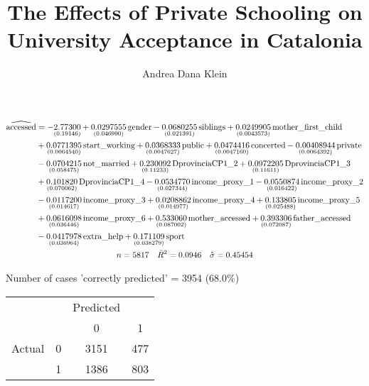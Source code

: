 \documentclass[11pt]{beamer}
\title{The Effects of Private Schooling on University Acceptance in Catalonia}
\author{Andrea Dana Klein}
\begin{document}
\begin{frame}
\titlepage 
\end{frame}

\begin{frame}
\scriptsize

\begin{gather}
\begin{split}
\widehat{\rm accessed} &= 
-\underset{(0.19146)}{2.77300}
+\underset{(0.046990)}{0.0297555}\,\mbox{gender}
-\underset{(0.021391)}{0.0680255}\,\mbox{siblings}
+\underset{(0.0043573)}{0.0249905}\,\mbox{mother\_first\_child}\\
& +\underset{(0.0064540)}{0.0771395}\,\mbox{start\_working}
+\underset{(0.0047627)}{0.0368333}\,\mbox{public}
+\underset{(0.0047160)}{0.0474416}\,\mbox{concerted}
-\underset{(0.0064392)}{0.00408944}\,\mbox{private}\\
& -\underset{(0.058475)}{0.0704215}\,\mbox{not\_married}
+\underset{(0.11233)}{0.230092}\,\mbox{DprovinciaCP1\_2}
+\underset{(0.11611)}{0.0972205}\,\mbox{DprovinciaCP1\_3}\\
& +\underset{(0.070062)}{0.101820}\,\mbox{DprovinciaCP1\_4}
-\underset{(0.027344)}{0.0534770}\,\mbox{income\_proxy\_1}
-\underset{(0.016422)}{0.0550874}\,\mbox{income\_proxy\_2}\\
& -\underset{(0.014617)}{0.0117200}\,\mbox{income\_proxy\_3}
+\underset{(0.014977)}{0.0208862}\,\mbox{income\_proxy\_4}
+\underset{(0.025488)}{0.133805}\,\mbox{income\_proxy\_5}\\
& +\underset{(0.036446)}{0.0616098}\,\mbox{income\_proxy\_6}
+\underset{(0.087002)}{0.533060}\,\mbox{mother\_accessed}
+\underset{(0.072087)}{0.393306}\,\mbox{father\_accessed}\\
& -\underset{(0.036964)}{0.0417978}\,\mbox{extra\_help}
+\underset{(0.038279)}{0.171109}\,\mbox{sport}
\end{split}
 \notag \\
n = 5817 \quad \bar{R}^2 = 0.0946 \quad \hat{\sigma} = 0.45454 \notag \\
\end{gather}

\end{frame}

\begin{frame}
\begin{center}

Number of cases 'correctly predicted' = 3954 (68.0\%)

\begin{tabular}{cccc}
&&Predicted&\\
&&0&1\\
Actual&0&3151&477\\
&1&1386&803\\
\end{tabular}
\end{center}
\end{frame}
\end{document}
